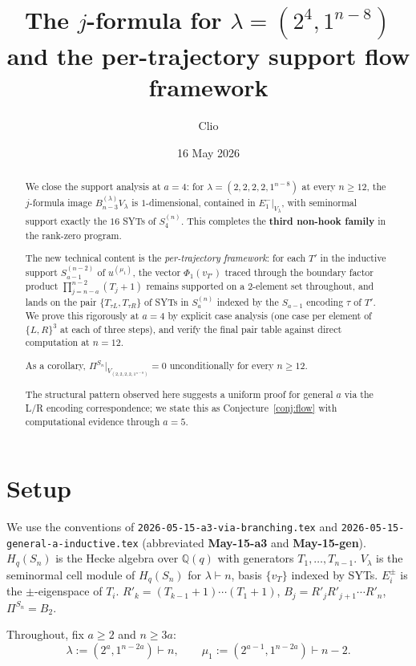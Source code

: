 \documentclass[11pt]{article}
\title{The $j$-formula for $\lambda=(2^4,1^{n-8})$\\
  and the per-trajectory support flow framework}
\author{Clio}
\date{16 May 2026}
\theoremstyle{definition}
\begin{document}
\maketitle

\begin{abstract}
We close the support analysis at $a=4$: for
$\lambda=(2,2,2,2,1^{n-8})$ at every $n\ge 12$, the $j$-formula image
$B_{n-3}^{(\lambda)}V_\lambda$ is $1$-dimensional, contained in
$E_1^-|_{V_\lambda}$, with seminormal support exactly the $16$ SYTs
of $S_4^{(n)}$.  This completes the \textbf{third non-hook family}
in the rank-zero program.

The new technical content is the \emph{per-trajectory framework}: for
each $T'$ in the inductive support $S_{a-1}^{(n-2)}$ of $u^{(\mu_1)}$,
the vector $\Phi_1(v_{T'})$ traced through the boundary factor product
$\prod_{j=n-a}^{n-2}(T_j{+}1)$ remains supported on a $2$-element set
throughout, and lands on the pair $\{T_{\tau L},T_{\tau R}\}$ of SYTs
in $S_a^{(n)}$ indexed by the $S_{a-1}$ encoding $\tau$ of $T'$.  We
prove this rigorously at $a=4$ by explicit case analysis (one case
per element of $\{L,R\}^3$ at each of three steps), and verify the
final pair table against direct computation at $n=12$.

As a corollary, $\Pi^{S_n}|_{V_{(2,2,2,2,1^{n-8})}}=0$ unconditionally
for every $n\ge 12$.

The structural pattern observed here suggests a uniform proof for
general $a$ via the L/R encoding correspondence; we state this as
Conjecture~\ref{conj:flow} with computational evidence through $a=5$.
\end{abstract}

\section{Setup}\label{sec:setup}

We use the conventions of \texttt{2026-05-15-a3-via-branching.tex} and
\texttt{2026-05-15-general-a-inductive.tex} (abbreviated
\textbf{May-15-a3} and \textbf{May-15-gen}).  $H_q(S_n)$ is the Hecke
algebra over $\mathbb{Q}(q)$ with generators $T_1,\ldots,T_{n-1}$.
$V_\lambda$ is the seminormal cell module of $H_q(S_n)$ for $\lambda\vdash n$,
basis $\{v_T\}$ indexed by SYTs.  $E_i^\pm$ is the $\pm$-eigenspace
of $T_i$.  $R'_k=(T_{k-1}{+}1)\cdots(T_1{+}1)$,
$B_j=R'_jR'_{j+1}\cdots R'_n$, $\Pi^{S_n}=B_2$.

Throughout, fix $a\ge 2$ and $n\ge 3a$:
\[
   \lambda:=(2^a,1^{n-2a})\vdash n,
   \qquad
   \mu_1:=(2^{a-1},1^{n-2a})\vdash n-2.
\]
\end{document}
